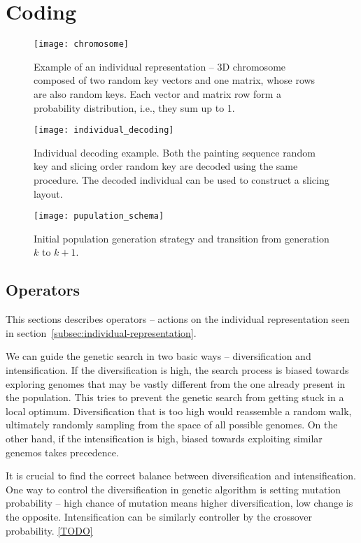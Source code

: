 \chapter{Coding}\label{ch:coding}


\begin{figure}[htp]
    \texttt{[image: chromosome]}\label{fig:chromosome}
    \caption{
        Example of an individual representation – 3D chromosome composed of two random key vectors
        and one matrix, whose rows are also random keys.
        Each vector and matrix row form a probability distribution, i.e., they sum up to 1.
    }
\end{figure}

\begin{figure}[htp]
    \texttt{[image: individual\_decoding]}
    \caption{
        Individual decoding example. Both the painting sequence random key and slicing order random key
        are decoded using the same procedure. The decoded individual can be used to construct a slicing layout.
    }
    \label{fig:individual-decoding}
\end{figure}

\begin{figure}[htp]
    \texttt{[image: pupulation\_schema]}\label{fig:population-schema}
    \caption{Initial population generation strategy and transition from generation $k$ to $k+1$.}
\end{figure}


\section{Operators}\label{sec:operators}
This sections describes operators – actions on the individual representation
seen in section~\ref{subsec:individual-representation}.

We can guide the genetic search in two basic ways – diversification and intensification.
If the diversification is high, the search process is biased towards exploring genomes
that may be vastly different from the one already present in the population.
This tries to prevent the genetic search from getting stuck in a local optimum.
Diversification that is too high would reassemble a random walk, ultimately randomly sampling
from the space of all possible genomes. On the other hand, if the intensification is high,
biased towards exploiting similar genemos takes precedence.

It is crucial to find the correct balance between diversification and intensification.
One way to control the diversification in genetic algorithm is setting
mutation probability – high chance of mutation means higher diversification, low change is the opposite.
Intensification can be similarly controller by the crossover probability.
\ref{TODO}

